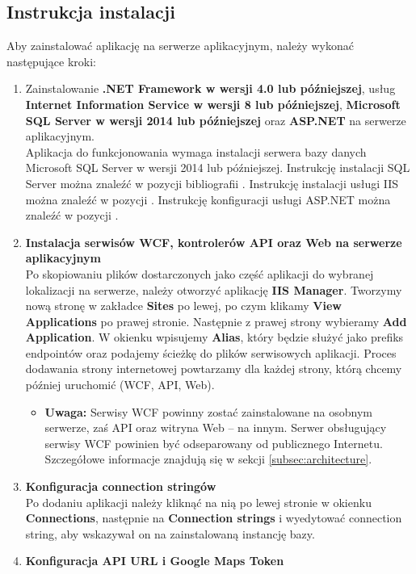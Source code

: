 \documentclass[10pt,a4paper]{article}
\begin{document}
\subsection{Instrukcja instalacji}
Aby zainstalować aplikację na serwerze aplikacyjnym, należy wykonać następujące kroki:
\begin{enumerate}
	\item Zainstalowanie \textbf{.NET Framework w wersji 4.0 lub późniejszej}, usług \textbf{Internet Information Service w wersji 8 lub późniejszej}, \textbf{Microsoft SQL Server w wersji 2014 lub późniejszej} oraz \textbf{ASP.NET} na serwerze aplikacyjnym. \\
	Aplikacja do funkcjonowania wymaga instalacji serwera bazy danych Microsoft SQL Server w wersji 2014 lub późniejszej. Instrukcję instalacji SQL Server można znaleźć w pozycji bibliografii \cite{sqlserver}. Instrukcję instalacji usługi IIS można znaleźć w pozycji \cite{iis}. Instrukcję konfiguracji usługi ASP.NET można znaleźć w pozycji \cite{aspnet}.
	\item \textbf{Instalacja serwisów WCF, kontrolerów API oraz Web na serwerze aplikacyjnym} \\
	Po skopiowaniu plików dostarczonych jako część aplikacji do wybranej lokalizacji na serwerze, należy otworzyć aplikację \textbf{IIS Manager}. Tworzymy nową stronę w zakładce \textbf{Sites} po lewej, po czym klikamy \textbf{View Applications} po prawej stronie. Następnie z prawej strony wybieramy \textbf{Add Application}. W okienku wpisujemy \textbf{Alias}, który będzie służyć jako prefiks endpointów oraz podajemy ścieżkę do plików serwisowych aplikacji. Proces dodawania strony internetowej powtarzamy dla każdej strony, którą chcemy później uruchomić (WCF, API, Web).
	\begin{itemize}
		\item \textbf{Uwaga:} Serwisy WCF powinny zostać zainstalowane na osobnym serwerze, zaś API oraz witryna Web -- na innym. Serwer obsługujący serwisy WCF powinien być odseparowany od publicznego Internetu. Szczegółowe informacje znajdują się w sekcji \ref{subsec:architecture}.
	\end{itemize}
	\item \textbf{Konfiguracja connection stringów} \\
	Po dodaniu aplikacji należy kliknąć na nią po lewej stronie w okienku \textbf{Connections}, następnie na \textbf{Connection strings} i wyedytować connection string, aby wskazywał on na zainstalowaną instancję bazy.
	\item \textbf{Konfiguracja API URL i Google Maps Token} \\

\end{enumerate}
\end{document}
